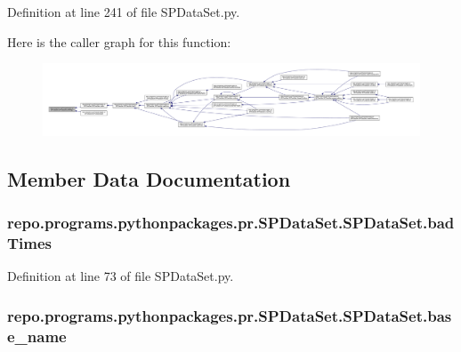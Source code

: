 Definition at line 241 of file S\-P\-Data\-Set.\-py.



Here is the caller graph for this function\-:
\nopagebreak
\begin{figure}[H]
\begin{center}
\leavevmode
\includegraphics[width=350pt]{classrepo_1_1programs_1_1pythonpackages_1_1pr_1_1SPDataSet_1_1SPDataSet_a6e8c2848a25079fc869ab950445213b8_icgraph}
\end{center}
\end{figure}




\subsection{Member Data Documentation}
\hypertarget{classrepo_1_1programs_1_1pythonpackages_1_1pr_1_1SPDataSet_1_1SPDataSet_aa2465f64a4035369a0d2a5f0b86d39fa}{
\subsubsection[{bad\-Times}]{\setlength{\rightskip}{0pt plus 5cm}repo.\-programs.\-pythonpackages.\-pr.\-S\-P\-Data\-Set.\-S\-P\-Data\-Set.\-bad\-Times}}\label{classrepo_1_1programs_1_1pythonpackages_1_1pr_1_1SPDataSet_1_1SPDataSet_aa2465f64a4035369a0d2a5f0b86d39fa}


Definition at line 73 of file S\-P\-Data\-Set.\-py.

\hypertarget{classrepo_1_1programs_1_1pythonpackages_1_1pr_1_1SPDataSet_1_1SPDataSet_a888b03e4e0141101e71ebd9f46eb494b}{
\subsubsection[{base\-\_\-name}]{\setlength{\rightskip}{0pt plus 5cm}repo.\-programs.\-pythonpackages.\-pr.\-S\-P\-Data\-Set.\-S\-P\-Data\-Set.\-base\-\_\-name}}\label{classrepo_1_1programs_1_1pythonpackages_1_1pr_1_1SPDataSet_1_1SPDataSet_a888b03e4e0141101e71ebd9f46eb494b}



